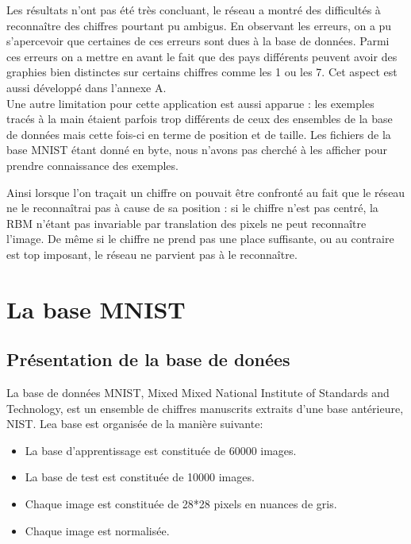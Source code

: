 \documentclass[a4paper,oneside]{report}
\begin{document}
Les résultats n'ont pas été très concluant, le réseau a montré des difficultés à reconnaître des chiffres pourtant pu ambigus. En observant les erreurs, on a pu s'apercevoir que certaines de ces erreurs sont dues à la base de données. Parmi ces erreurs on a mettre en avant le fait que des pays différents peuvent avoir des graphies bien distinctes sur certains chiffres comme les 1 ou les 7. Cet aspect est aussi développé dans l'annexe A.\\

Une autre limitation pour cette application est aussi apparue : les exemples tracés à la main étaient parfois trop différents de ceux des ensembles de la base de données mais cette fois-ci en terme de position et de taille. Les fichiers de la base MNIST étant donné en byte, nous n'avons pas cherché à les afficher pour prendre connaissance des exemples. 

Ainsi lorsque l'on traçait un chiffre on pouvait être confronté au fait que le réseau ne le reconnaîtrai pas à cause de sa position : si le chiffre n'est pas centré, la RBM n'étant pas invariable par translation des pixels ne peut reconnaître l'image. De même si le chiffre ne prend pas une place suffisante, ou au contraire est top imposant, le réseau ne parvient pas à le reconnaître.

\nocite{hopfield_neural_1982}
\nocite{*}




    \appendix

    \chapter{La base MNIST}

            \section{Présentation de la base de donées}

                La base de données MNIST, Mixed Mixed National Institute of Standards and Technology, 
est un ensemble de chiffres manuscrits extraits d'une base antérieure, NIST. Lea base 
est organisée de la manière 
suivante:

                \begin{itemize}
                    \item La base d'apprentissage est constituée de 60000 images.
                    \item La base de test est constituée de 10000 images.
                    \item Chaque image est constituée de 28*28 pixels en nuances de gris.
                    \item Chaque image est normalisée.\\
                \end{itemize}
\end{document}
